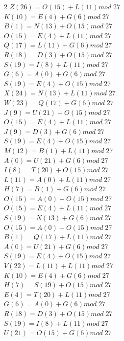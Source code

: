 \documentclass{article}
\begin{document}
\begin{enumerate}
\begin{multicols}{2}
$Z (26) = O(15) + L (11) mod \; 27$ \\
$K (10) = E(4) + G (6) mod \; 27$ \\
$B (1) = N(13) + O (15) mod \; 27$ \\
$O (15) = E(4) + L (11) mod \; 27$ \\
$Q (17) = L(11) + G (6) mod \; 27$ \\
$R (18) = D(3) + O (15) mod \; 27$ \\
$S (19) = I(8) + L (11) mod \; 27$ \\
$G (6) = A(0) + G (6) mod \; 27$ \\
$S (19) = E(4) + O (15) mod \; 27$ \\
$X (24) = N(13) + L (11) mod \; 27$ \\
$W (23) = Q(17) + G (6) mod \; 27$ \\
$J (9) = U(21) + O (15) mod \; 27$ \\
$O (15) = E(4) + L (11) mod \; 27$ \\
$J (9) = D(3) + G (6) mod \; 27$ \\
$S (19) = E(4) + O (15) mod \; 27$ \\
$M (12) = B(1) + L (11) mod \; 27$ \\
$A (0) = U(21) + G (6) mod \; 27$ \\
$I (8) = T(20) + O (15) mod \; 27$ \\
$L (11) = A(0) + L (11) mod \; 27$ \\
$H (7) = B(1) + G (6) mod \; 27$ \\
$O (15) = A(0) + O (15) mod \; 27$ \\
$O (15) = E(4) + L (11) mod \; 27$ \\
$S (19) = N(13) + G (6) mod \; 27$ \\
$O (15) = A(0) + O (15) mod \; 27$ \\
$B (1) = Q(17) + L (11) mod \; 27$ \\
$A (0) = U(21) + G (6) mod \; 27$ \\
$S (19) = E(4) + O (15) mod \; 27$ \\
$V (22) = L(11) + L (11) mod \; 27$ \\
$K (10) = E(4) + G (6) mod \; 27$ \\
$H (7) = S(19) + O (15) mod \; 27$ \\
$E (4) = T(20) + L (11) mod \; 27$ \\
$G (6) = A(0) + G (6) mod \; 27$ \\ 
$R (18) = D(3) + O (15) mod \; 27$ \\
$S (19) = I(8) + L (11) mod \; 27$ \\
$U (21) = O(15) + G (6) mod \; 27$ \\ 
\end{multicols}




\end{enumerate}
\end{document}

